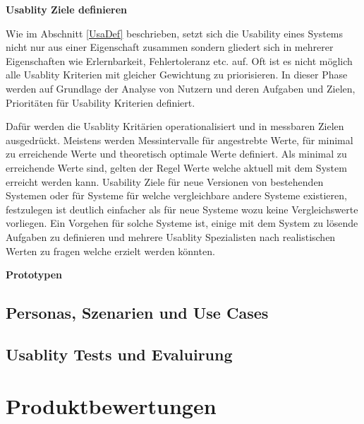 \vspace{5mm} 
\textbf{Usablity Ziele definieren} 

Wie im Abschnitt \ref{UsaDef} beschrieben, setzt sich die Usability eines Systems nicht nur aus einer Eigenschaft zusammen sondern gliedert sich in mehrerer Eigenschaften wie Erlernbarkeit, Fehlertoleranz etc. auf. 
Oft ist es nicht möglich alle Usablity Kriterien mit gleicher Gewichtung zu priorisieren. In dieser Phase werden auf Grundlage der Analyse von Nutzern und deren Aufgaben und Zielen, Prioritäten für Usability Kriterien definiert. 

Dafür werden die Usablity Kritärien operationalisiert und in messbaren Zielen ausgedrückt. Meistens werden Messintervalle für angestrebte Werte, für minimal zu erreichende Werte und theoretisch optimale Werte definiert. 
Als minimal zu erreichende Werte sind, gelten der Regel Werte welche aktuell mit dem System erreicht werden kann. Usability Ziele für neue Versionen von bestehenden Systemen oder für Systeme für welche vergleichbare andere 
Systeme existieren, festzulegen ist deutlich einfacher als für neue Systeme wozu keine Vergleichswerte vorliegen. Ein Vorgehen für solche Systeme ist, einige mit dem System zu lösende Aufgaben zu definieren und mehrere Usablity Spezialisten nach realistischen Werten zu fragen welche erzielt werden könnten.

\vspace{5mm} 
\textbf{Prototypen}





\subsection{Personas, Szenarien und Use Cases}




\subsection{Usablity Tests und Evaluirung}

\section{Produktbewertungen}


